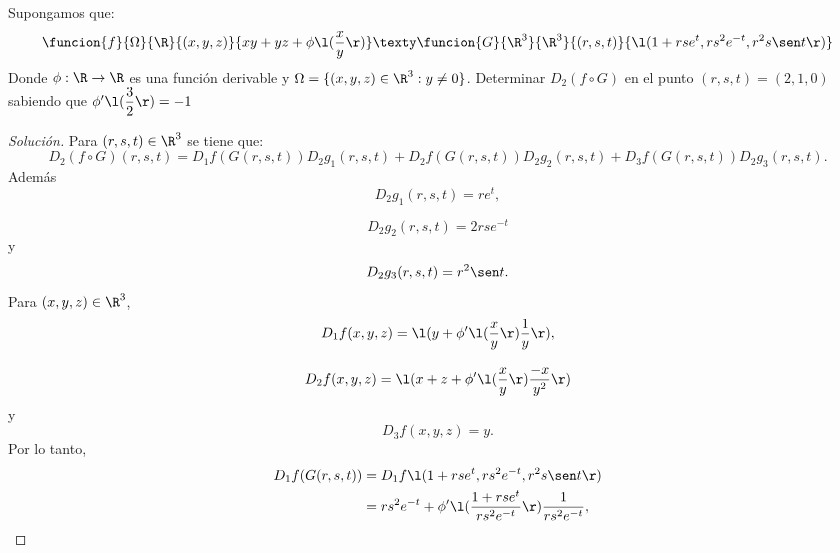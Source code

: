 \documentclass[a4,11pt]{aleph-notas}
\begin{document}
\begin{ejer}
Supongamos que:
	\[
        \funcion{f}{\Omega}{\R}{(x,y,z)}
        {xy+yz+\phi \l( \dfrac{x}{y}\r)} \texty \funcion{G}{\R^3}{\R^3}{(r,s,t)}
        {\l(1+rse^t,rs^2e^{-t},r^2s \sen t\r)}
    \]
    Donde $\phi: \R \rightarrow \R$ es una función derivable y $\Omega=\{(x,y,z)\in\R^3:y\neq 0\} $. Determinar $D_2(f \circ G) $ en el punto $(r,s,t)=(2,1,0)$ sabiendo que $\phi' \l(\dfrac{3}{2}\r)=-1 $
\end{ejer}

\begin{proof}[Solución]
Para $(r,s,t) \in \R^3$ se tiene que:
	\[
	    D_2(f \circ G)(r,s,t)=D_1f(G(r,s,t))D_2g_1(r,s,t)+D_2f(G(r,s,t))D_2g_2(r,s,t)+D_3f(G(r,s,t))D_2g_3(r,s,t).
    \]
    Además
	\[
    	D_2g_1(r,s,t)=re^t,
    \]

    \[
	    D_2g_2(r,s,t)=2rse^{-t}
    \]
    y
    \[
	    D_2g_3(r,s,t)=r^2 \sen t.
    \]
    Para $(x,y,z) \in \R^3$,
    \[
	    D_1f(x,y,z)=\l(y + \phi' \l( \dfrac{x}{y} \r) \dfrac{1}{y}\r),
    \]
    
    \[
	    D_2f(x,y,z)=\l(x+z+ \phi' \l( \dfrac{x}{y} \r) \dfrac{-x}{y^2}\r)
    \]
    y
    \[
	    D_3f(x,y,z)=y.
    \]
    Por lo tanto,
    \[
        \begin{aligned}
        D_1f(G(r,s,t))&= D_1f\l(1+rse^t,rs^2e^{-t},r^2s \sen t\r)\\&=rs^2e^{-t} + \phi' \l( \dfrac{1+rse^t}{rs^2e^{-t}} \r) \dfrac{1}{rs^2e^{-t}},
        \end{aligned}
    \]
    

\end{proof}
\end{document}
